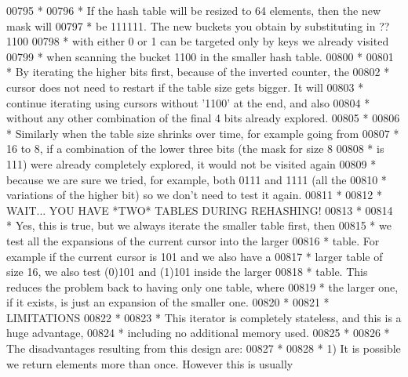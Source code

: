 \begin{DoxyCode}
00795 \textcolor{comment}{ *}
00796 \textcolor{comment}{ * If the hash table will be resized to 64 elements, then the new mask will}
00797 \textcolor{comment}{ * be 111111. The new buckets you obtain by substituting in ??1100}
00798 \textcolor{comment}{ * with either 0 or 1 can be targeted only by keys we already visited}
00799 \textcolor{comment}{ * when scanning the bucket 1100 in the smaller hash table.}
00800 \textcolor{comment}{ *}
00801 \textcolor{comment}{ * By iterating the higher bits first, because of the inverted counter, the}
00802 \textcolor{comment}{ * cursor does not need to restart if the table size gets bigger. It will}
00803 \textcolor{comment}{ * continue iterating using cursors without '1100' at the end, and also}
00804 \textcolor{comment}{ * without any other combination of the final 4 bits already explored.}
00805 \textcolor{comment}{ *}
00806 \textcolor{comment}{ * Similarly when the table size shrinks over time, for example going from}
00807 \textcolor{comment}{ * 16 to 8, if a combination of the lower three bits (the mask for size 8}
00808 \textcolor{comment}{ * is 111) were already completely explored, it would not be visited again}
00809 \textcolor{comment}{ * because we are sure we tried, for example, both 0111 and 1111 (all the}
00810 \textcolor{comment}{ * variations of the higher bit) so we don't need to test it again.}
00811 \textcolor{comment}{ *}
00812 \textcolor{comment}{ * WAIT... YOU HAVE *TWO* TABLES DURING REHASHING!}
00813 \textcolor{comment}{ *}
00814 \textcolor{comment}{ * Yes, this is true, but we always iterate the smaller table first, then}
00815 \textcolor{comment}{ * we test all the expansions of the current cursor into the larger}
00816 \textcolor{comment}{ * table. For example if the current cursor is 101 and we also have a}
00817 \textcolor{comment}{ * larger table of size 16, we also test (0)101 and (1)101 inside the larger}
00818 \textcolor{comment}{ * table. This reduces the problem back to having only one table, where}
00819 \textcolor{comment}{ * the larger one, if it exists, is just an expansion of the smaller one.}
00820 \textcolor{comment}{ *}
00821 \textcolor{comment}{ * LIMITATIONS}
00822 \textcolor{comment}{ *}
00823 \textcolor{comment}{ * This iterator is completely stateless, and this is a huge advantage,}
00824 \textcolor{comment}{ * including no additional memory used.}
00825 \textcolor{comment}{ *}
00826 \textcolor{comment}{ * The disadvantages resulting from this design are:}
00827 \textcolor{comment}{ *}
00828 \textcolor{comment}{ * 1) It is possible we return elements more than once. However this is usually}

\end{DoxyCode}
